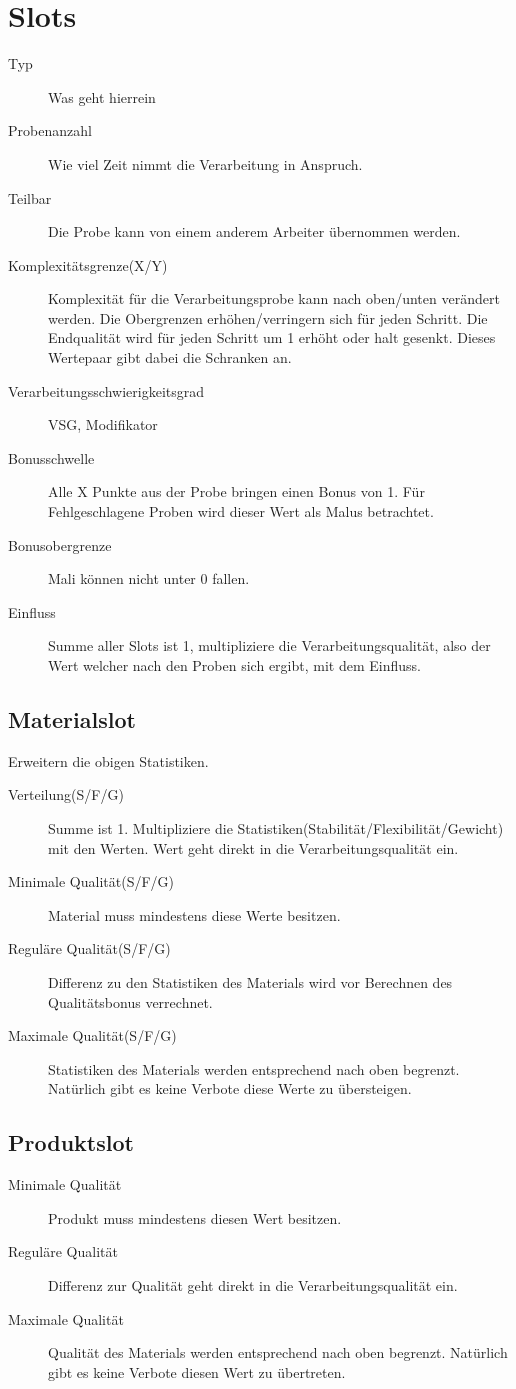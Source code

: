 \documentclass[a4paper,12pt,oneside]{book}
\begin{document}
\section{Slots}
\begin{description}
\item[Typ]Was geht hierrein
\item[Probenanzahl]Wie viel Zeit nimmt die Verarbeitung in Anspruch.
\item[Teilbar]Die Probe kann von einem anderem Arbeiter übernommen werden.
\item[Komplexitätsgrenze(X/Y)]Komplexität für die Verarbeitungsprobe kann nach oben/unten verändert werden. Die Obergrenzen erhöhen/verringern sich für jeden Schritt. Die Endqualität wird für jeden Schritt um 1 erhöht oder halt gesenkt. Dieses Wertepaar gibt dabei die Schranken an.
\item[Verarbeitungsschwierigkeitsgrad]VSG, Modifikator
\item[Bonusschwelle]Alle X Punkte aus der Probe bringen einen Bonus von 1. Für Fehlgeschlagene Proben wird dieser Wert als Malus betrachtet.
\item[Bonusobergrenze]Mali können nicht unter 0 fallen.
\item[Einfluss]Summe aller Slots ist 1, multipliziere die Verarbeitungsqualität, also der Wert welcher nach den Proben sich ergibt, mit dem Einfluss.
\end{description}

\subsection{Materialslot}
Erweitern die obigen Statistiken.
\begin{description}
\item[Verteilung(S/F/G)]Summe ist 1. Multipliziere die Statistiken(Stabilität/Flexibilität/Gewicht) mit den Werten. Wert geht direkt in die Verarbeitungsqualität ein.
\item[Minimale Qualität(S/F/G)]Material muss mindestens diese Werte besitzen.
\item[Reguläre Qualität(S/F/G)]Differenz zu den Statistiken des Materials wird vor Berechnen des Qualitätsbonus verrechnet.
\item[Maximale Qualität(S/F/G)]Statistiken des Materials werden entsprechend nach oben begrenzt. Natürlich gibt es keine Verbote diese Werte zu übersteigen.
\end{description}

\subsection{Produktslot}
\begin{description}
\item[Minimale Qualität]Produkt muss mindestens diesen Wert besitzen.
\item[Reguläre Qualität]Differenz zur Qualität geht direkt in die Verarbeitungsqualität ein.
\item[Maximale Qualität]Qualität des Materials werden entsprechend nach oben begrenzt. Natürlich gibt es keine Verbote diesen Wert zu übertreten.
\end{description}
\end{document}
